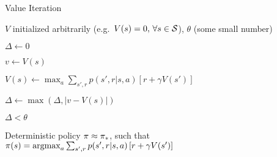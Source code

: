 
\begin{algorithm}
\caption{Value Iteration}
\label{alg:valueiter}

\begin{algorithmic}[0]

	\Require $V$ initialized arbitrarily
		(e.g.\ $V(s) = 0, \, \forall s \in \mathcal{S}$),
		$\theta$ (some small number)

	\Repeat

		\State $\Delta \gets 0$


			\State $v \gets V(s)$

			\State $V(s) \gets
				\max_a \sum_{s',r} {
					p(s',r|s,a)\left[ r + \gamma V(s') \right]
				}$

			\State $\Delta \gets \max(\Delta, |v-V(s)|)$

		\EndFor

	\Until $\Delta < \theta$

	\State \Return Deterministic policy $\pi \approx \pi_*$,
		such that \\ \quad
		$\pi(s) = \operatorname*{argmax}_a \sum_{s',r} {
					p(s',r|s,a)\left[ r + \gamma V(s') \right]
				}$

\end{algorithmic}

\end{algorithm}
